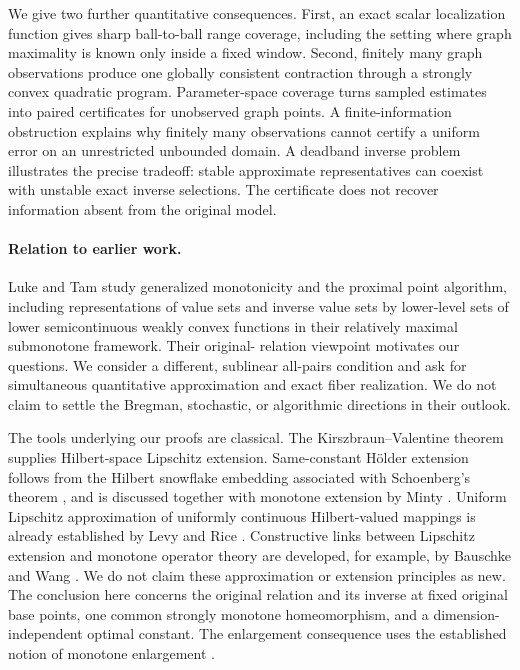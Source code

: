 \documentclass[11pt]{article}
\numberwithin{equation}{section}
\theoremstyle{definition}
\theoremstyle{remark}
\begin{document}
We give two further quantitative consequences. First, an exact scalar
localization function gives sharp ball-to-ball range coverage, including
the setting where graph maximality is known only inside a fixed window.
Second, finitely many graph observations produce one globally consistent
contraction through a strongly convex quadratic program. Parameter-space
coverage turns sampled estimates into paired certificates for unobserved
graph points. A finite-information obstruction explains why finitely many
observations cannot certify a uniform error on an unrestricted unbounded
domain. A deadband inverse problem illustrates the precise tradeoff:
stable approximate representatives can coexist with unstable exact inverse
selections. The certificate does not recover information absent from the
original model.

\paragraph{Relation to earlier work.}
Luke and Tam \cite[Theorem~1]{LukeTam} study generalized monotonicity and the proximal
point algorithm, including representations of value sets and inverse value
sets by lower-level sets of lower semicontinuous weakly convex functions
in their relatively maximal submonotone framework. Their original-
relation viewpoint motivates our questions. We consider a different,
sublinear all-pairs condition and ask for simultaneous quantitative
approximation and exact fiber realization. We do not claim to settle the
Bregman, stochastic, or algorithmic directions in their outlook.

The tools underlying our proofs are classical. The Kirszbraun--Valentine
theorem \cite{Kirszbraun,Valentine} supplies Hilbert-space Lipschitz
extension. Same-constant
H\"older extension follows from the Hilbert snowflake embedding associated
with Schoenberg's theorem \cite{Schoenberg}, and is discussed together with
monotone extension by Minty \cite{Minty1970}. Uniform Lipschitz approximation
of uniformly continuous Hilbert-valued mappings is already established
by Levy and Rice \cite{LevyRice}. Constructive links between Lipschitz
extension and monotone operator theory are developed, for example, by
Bauschke and Wang \cite{BauschkeWang}. We do not claim these approximation or
extension principles as new. The conclusion here concerns the original
relation and its inverse at fixed original base points, one common
strongly monotone homeomorphism, and a dimension-independent optimal
constant. The enlargement consequence uses the established notion of
monotone enlargement \cite{BurachikIusemSvaiter}.
\end{document}
